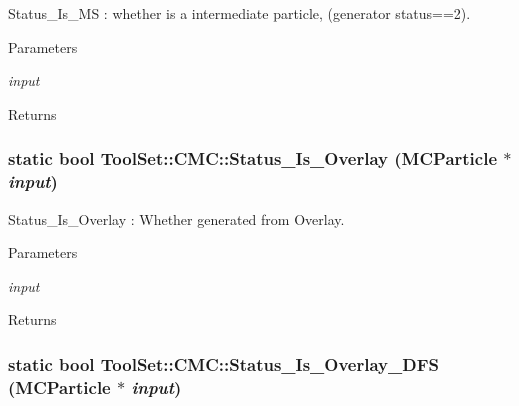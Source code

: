 Status\_\-Is\_\-MS : whether is a intermediate particle, (generator status==2). 
\begin{DoxyParams}{Parameters}
\item[{\em input}]\end{DoxyParams}
\begin{DoxyReturn}{Returns}

\end{DoxyReturn}
\hypertarget{classToolSet_1_1CMC_a9d3659a1fd4bad33a54c08769902e998}{
\subsubsection[{Status\_\-Is\_\-Overlay}]{\setlength{\rightskip}{0pt plus 5cm}static bool ToolSet::CMC::Status\_\-Is\_\-Overlay (MCParticle $\ast$ {\em input})}}
\label{classToolSet_1_1CMC_a9d3659a1fd4bad33a54c08769902e998}


Status\_\-Is\_\-Overlay : Whether generated from Overlay. 
\begin{DoxyParams}{Parameters}
\item[{\em input}]\end{DoxyParams}
\begin{DoxyReturn}{Returns}

\end{DoxyReturn}
\hypertarget{classToolSet_1_1CMC_acb83c834c9e5e1c33f8c2514e4c40d93}{
\subsubsection[{Status\_\-Is\_\-Overlay\_\-DFS}]{\setlength{\rightskip}{0pt plus 5cm}static bool ToolSet::CMC::Status\_\-Is\_\-Overlay\_\-DFS (MCParticle $\ast$ {\em input})}}
\label{classToolSet_1_1CMC_acb83c834c9e5e1c33f8c2514e4c40d93}


